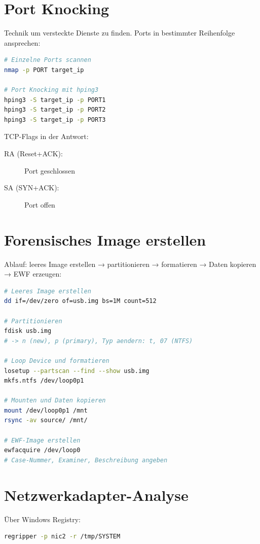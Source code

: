\section{Port Knocking}

Technik um versteckte Dienste zu finden.
Ports in bestimmter Reihenfolge ansprechen:

\begin{lstlisting}[language=bash]
# Einzelne Ports scannen
nmap -p PORT target_ip

# Port Knocking mit hping3
hping3 -S target_ip -p PORT1
hping3 -S target_ip -p PORT2
hping3 -S target_ip -p PORT3
\end{lstlisting}

TCP-Flags in der Antwort:
\begin{description}
	\item[RA (Reset+ACK):] Port geschlossen
	\item[SA (SYN+ACK):] Port offen
\end{description}

\section{Forensisches Image erstellen}

Ablauf: leeres Image erstellen → partitionieren → formatieren → Daten kopieren → EWF erzeugen:

\begin{lstlisting}[language=bash]
# Leeres Image erstellen
dd if=/dev/zero of=usb.img bs=1M count=512

# Partitionieren
fdisk usb.img
# -> n (new), p (primary), Typ aendern: t, 07 (NTFS)

# Loop Device und formatieren
losetup --partscan --find --show usb.img
mkfs.ntfs /dev/loop0p1

# Mounten und Daten kopieren
mount /dev/loop0p1 /mnt
rsync -av source/ /mnt/

# EWF-Image erstellen
ewfacquire /dev/loop0
# Case-Nummer, Examiner, Beschreibung angeben
\end{lstlisting}

\section{Netzwerkadapter-Analyse}

Über Windows Registry:

\begin{lstlisting}[language=bash]
regripper -p nic2 -r /tmp/SYSTEM
\end{lstlisting}

